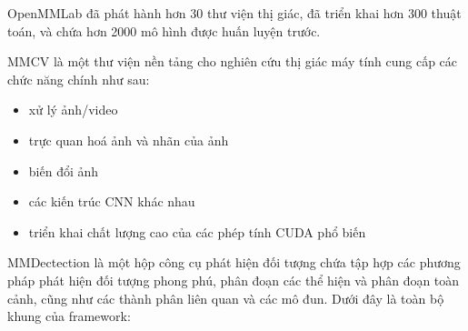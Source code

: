 \documentclass[12pt,a4paper,openany,oneside]{report}
\begin{document}
OpenMMLab đã phát hành hơn 30 thư viện thị giác, đã triển khai hơn 300 thuật toán, và chứa hơn 2000 mô hình được huấn luyện trước.

MMCV là một thư viện nền tảng cho nghiên cứu thị giác máy tính cung cấp các chức năng chính như sau:
\begin{itemize}
	\item xử lý ảnh/video
	\item trực quan hoá ảnh và nhãn của ảnh
	\item biến đổi ảnh
	\item các kiến trúc CNN khác nhau
	\item triển khai chất lượng cao của các phép tính CUDA phổ biến
\end{itemize}

MMDectection là một hộp công cụ phát hiện đối tượng chứa tập hợp các phương pháp phát hiện đối tượng phong phú, phân đoạn các thể hiện và phân đoạn toàn cảnh, cũng như  các thành phân liên quan và các mô đun. Dưới đây là toàn bộ khung của framework:
\end{document}
